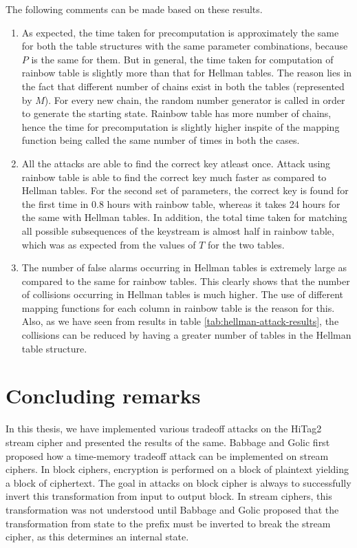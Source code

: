 The following comments can be made based on these results.
\begin{enumerate}
\item As expected, the time taken for precomputation is approximately the same for both the table structures with the same parameter combinations, because $P$ is the same for them. But in general, the time taken for computation of rainbow table is slightly more than that for Hellman tables. The reason lies in the fact that different number of chains exist in both the tables (represented by $M$). For every new chain, the random number generator is called in order to generate the starting state. Rainbow table has more number of chains, hence the time for precomputation is slightly higher inspite of the mapping function being called the same number of times in both the cases. 
  
\item All the attacks are able to find the correct key atleast once. Attack using rainbow table is able to find the correct key much faster as compared to Hellman tables. For the second set of parameters, the correct key is found for the first time in 0.8 hours with rainbow table, whereas it takes 24 hours for the same with Hellman tables. In addition, the total time taken for matching all possible subsequences of the keystream is almost half in rainbow table, which was as expected from the values of $T$ for the two tables.

\item The number of false alarms occurring in Hellman tables is extremely large as compared to the same for rainbow tables. This clearly shows that the number of collisions occurring in Hellman tables is much higher. The use of different mapping functions for each column in rainbow table is the reason for this. Also, as we have seen from results in table \ref{tab:hellman-attack-results}, the collisions can be reduced by having a greater number of tables in the Hellman table structure.
\end{enumerate}

\newpage
\section{Concluding remarks}

In this thesis, we have implemented various tradeoff attacks on the HiTag2 stream cipher and presented the results of the same. Babbage and Golic first proposed how a time-memory tradeoff attack can be implemented on stream ciphers. In block ciphers, encryption is performed on a block of plaintext yielding a block of ciphertext. The goal in attacks on block cipher is always to successfully invert this transformation from input to output block. In stream ciphers, this transformation was not understood until Babbage and Golic proposed that the transformation from state to the prefix must be inverted to break the stream cipher, as this determines an internal state. 

